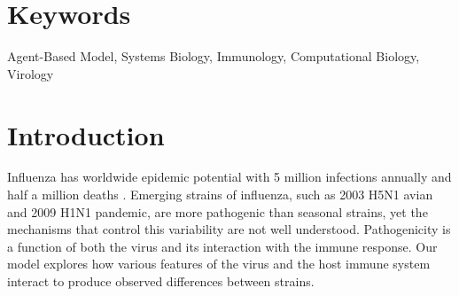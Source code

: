 \documentclass[preprint,10pt,authoryear]{elsarticle}
\begin{document}



\section*{Keywords}

Agent-Based Model, Systems Biology, Immunology, Computational Biology, Virology


\section*{Introduction}

Influenza has worldwide epidemic potential with 5 million infections annually and half a million deaths \citep{Who2009}.  Emerging strains of influenza, such as 2003 H5N1 avian and 2009 H1N1 pandemic, are more pathogenic than seasonal strains, yet the mechanisms that control this variability are not well understood.  Pathogenicity is a function of both the virus and its interaction with the immune response. Our model explores how various features of the virus and the host immune system interact to produce observed differences between strains.
\end{document}
